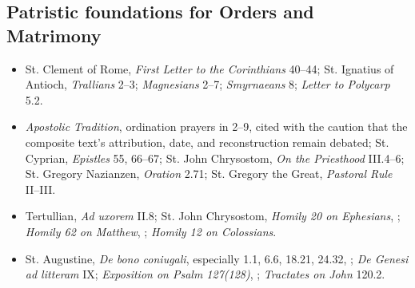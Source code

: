 \subsection*{Patristic foundations for Orders and Matrimony}
{\footnotesize
\begin{itemize}[nosep]
\item St. Clement of Rome, \emph{First Letter to the Corinthians} 40--44; St. Ignatius of Antioch, \emph{Trallians} 2--3; \emph{Magnesians} 2--7; \emph{Smyrnaeans} 8; \emph{Letter to Polycarp} 5.2.
\item \emph{Apostolic Tradition}, ordination prayers in 2--9, cited with the caution that the composite text's attribution, date, and reconstruction remain debated; St. Cyprian, \emph{Epistles} 55, 66--67; St. John Chrysostom, \emph{On the Priesthood} III.4--6; St. Gregory Nazianzen, \emph{Oration} 2.71; St. Gregory the Great, \emph{Pastoral Rule} II--III.
\item Tertullian, \emph{Ad uxorem} II.8; St. John Chrysostom, \emph{Homily 20 on Ephesians}, ; \emph{Homily 62 on Matthew}, ; \emph{Homily 12 on Colossians}.
\item St. Augustine, \emph{De bono coniugali}, especially 1.1, 6.6, 18.21, 24.32, ; \emph{De Genesi ad litteram} IX; \emph{Exposition on Psalm 127(128)}, ; \emph{Tractates on John} 120.2.
\end{itemize}
}

